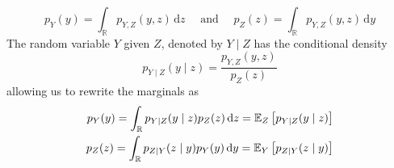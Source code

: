\documentclass[../../Main_ManuscritThese.tex]{subfiles}
\begin{document}
\begin{definition}
  \begin{equation}
    \label{eq:marginals_def}
    p_{Y}(y) = \int_{\mathbb{R}}p_{Y,Z}(y,z) \,\mathrm{d}z \quad \text{ and } \quad p_{Z}(z) = \int_{\mathbb{R}}p_{Y,Z}(y,z) \,\mathrm{d}y
  \end{equation}
  The random variable $Y$ given $Z$, denoted by $Y \mid Z$ has the conditional density
  \begin{equation}
    p_{Y \mid Z}(y \mid z) = \frac{p_{Y,Z}(y,z)}{p_Z(z)}
  \end{equation}
  allowing us to rewrite the marginals as
  \begin{align}
    \label{eq:marginal_conditioned}
        p_{Y}(y) = \int_{\mathbb{R}}p_{Y\mid Z}(y\mid z)p_Z(z) \,\mathrm{d}z=\mathbb{E}_Z\left[p_{Y\mid Z}(y\mid z)\right] \\ p_{Z}(z) = \int_{\mathbb{R}}p_{Z\mid Y}(z\mid y)p_Y(y) \,\mathrm{d}y = \mathbb{E}_{Y}\left[p_{Z\mid Y}(z\mid y)\right]
  \end{align}

\end{definition}
\end{document}
